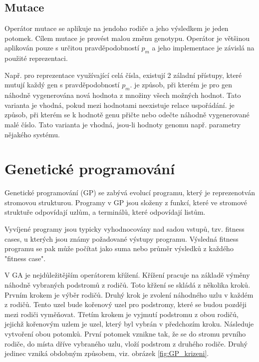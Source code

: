 \subsection{Mutace}
Operátor mutace se aplikuje na jendoho rodiče a jeho výsledkem je jeden potomek.
Cílem mutace je provést malou změnu genotypu.
Operátor je většinou aplikován pouze s určitou pravděpodobností $p_m$ a jeho implementace je závislá na použité reprezentaci.


Např. pro reprezentace využívající celá čísla, existují 2 záladní přístupy, které mutují každý gen s pravděpodobností $p_m$.
 je způsob, při kterém je pro gen náhodně vygenerována nová hodnota z množiny všech možných hodnot.
Tato varianta je vhodná, pokud mezi hodnotami neexistuje relace uspořádání.
 je způsob, při kterém se k hodnotě genu přičte nebo odečte náhodně vygenerované malé číslo.
Tato varianta je vhodná, jsou-li hodnoty genomu např. parametry nějakého systému.


\section{Genetické programování}
Genetické programování (GP) se zabývá evolucí programu, který je reprezenotván stromovou strukturou.
Programy v GP jsou složeny z funkcí, které ve stromové struktuře odpovídají uzlům, a terminálů, které odpovídají listům.

Vyvíjené programy jsou typicky vyhodnocovány nad sadou vstupů, tzv. fitness cases, u kterých jsou známy požadované výstupy programu.
Výsledná fitness programu se pak může počítat jako suma nebo průměr výsledků z každého "fitness case".

V GA je nejdůležitějším operátorem křížení.
Křížení pracuje na základě výměny náhodně vybraných podstromů z rodičů.
Toto křžení se skládá z několika kroků.
Prvním krokem je výběr rodičů.
Druhý krok je zvolení náhodného uzlu v každém z rodičů.
Tento uzel bude kořenový uzel pro podstromy, které se budou později mezi rodiči vyměňovat.
Třetím krokem je vyjmutí podstromu z obou rodičů, jejichž kořenovým uzlem je uzel, který byl vybrán v předchozím kroku.
Následuje vytvoření obou potomků.
První potomek vznikne tak, že se do stromu prvního rodiče, do místa dříve vybraného uzlu, vloží podstrom z druhého rodiče.
Druhý jedinec vzniká obdobným způsobem, viz. obrázek \ref{fig:GP_krizeni}.


